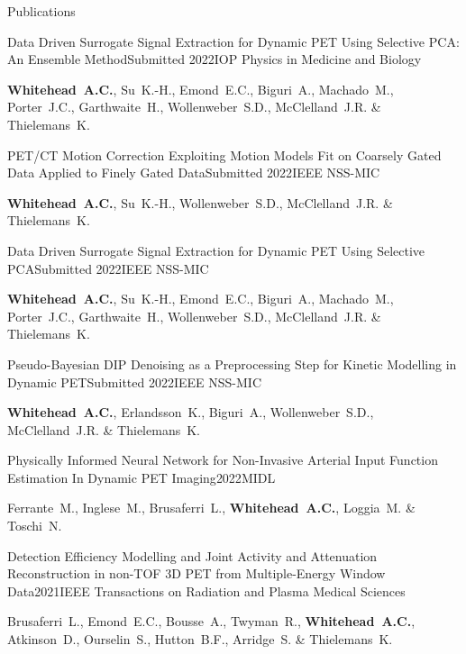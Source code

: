 \documentclass{cv}
\begin{document}
    \begin{rSection}{Publications}
        \begin{rSubsection}{Data Driven Surrogate Signal Extraction for Dynamic PET Using Selective PCA: An Ensemble Method}{Submitted 2022}{IOP Physics in Medicine and Biology}{}
            \item {\bf Whitehead~A.C.}, Su~K.-H., Emond~E.C., Biguri~A., Machado~M., Porter~J.C., Garthwaite~H., Wollenweber~S.D., McClelland~J.R. \& Thielemans~K.
        \end{rSubsection}
        
        \begin{rSubsection}{PET/CT Motion Correction Exploiting Motion Models Fit on Coarsely Gated Data Applied to Finely Gated Data}{Submitted 2022}{IEEE NSS-MIC}{}
            \item {\bf Whitehead~A.C.}, Su~K.-H., Wollenweber~S.D., McClelland~J.R. \& Thielemans~K.
        \end{rSubsection}
        
        \begin{rSubsection}{Data Driven Surrogate Signal Extraction for Dynamic PET Using Selective PCA}{Submitted 2022}{IEEE NSS-MIC}{}
            \item {\bf Whitehead~A.C.}, Su~K.-H., Emond~E.C., Biguri~A., Machado~M., Porter~J.C., Garthwaite~H., Wollenweber~S.D., McClelland~J.R. \& Thielemans~K.
        \end{rSubsection}
        
        \begin{rSubsection}{Pseudo-Bayesian DIP Denoising as a Preprocessing Step for Kinetic Modelling in Dynamic \newline PET}{Submitted 2022}{IEEE NSS-MIC}{}
            \item {\bf Whitehead~A.C.}, Erlandsson~K., Biguri~A., Wollenweber~S.D., McClelland~J.R. \& Thielemans~K.
        \end{rSubsection}
        
        \begin{rSubsection}{Physically Informed Neural Network for Non-Invasive Arterial Input Function Estimation In Dynamic PET Imaging}{2022}{MIDL}{}
            \item Ferrante~M., Inglese~M., Brusaferri~L., {\bf Whitehead~A.C.}, Loggia~M. \& Toschi~N.
        \end{rSubsection}
        
        \begin{rSubsection}{Detection Efficiency Modelling and Joint Activity and Attenuation Reconstruction in non-TOF 3D PET from Multiple-Energy Window Data}{2021}{IEEE Transactions on Radiation and Plasma Medical Sciences}{}
            \item Brusaferri~L., Emond~E.C., Bousse~A., Twyman~R., {\bf Whitehead~A.C.}, Atkinson~D., Ourselin~S., Hutton~B.F., Arridge~S. \& Thielemans~K.
        \end{rSubsection}
        

\end{rSection}
\end{document}
